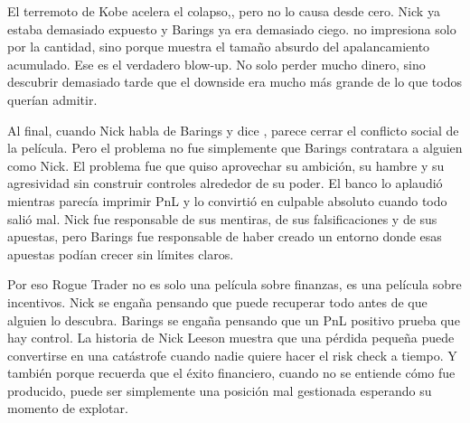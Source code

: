 El terremoto de Kobe acelera el colapso,, pero no lo causa desde cero. Nick ya estaba demasiado expuesto y Barings ya era demasiado ciego.   no impresiona solo por la cantidad, sino porque muestra el tamaño absurdo del apalancamiento acumulado. Ese es el verdadero blow-up. No solo perder mucho dinero, sino descubrir demasiado tarde que el downside era mucho más grande de lo que todos querían admitir.

Al final, cuando Nick habla de Barings y dice , parece cerrar el conflicto social de la película. Pero el problema no fue simplemente que Barings contratara a alguien como Nick. El problema fue que quiso aprovechar su ambición, su hambre y su agresividad sin construir controles alrededor de su poder. El banco lo aplaudió mientras parecía imprimir PnL y lo convirtió en culpable absoluto cuando todo salió mal. Nick fue responsable de sus mentiras, de sus falsificaciones y de sus apuestas, pero Barings fue responsable de haber creado un entorno donde esas apuestas podían crecer sin límites claros.

Por eso Rogue Trader no es solo una película sobre finanzas, es una película sobre incentivos. Nick se engaña pensando que puede recuperar todo antes de que alguien lo descubra. Barings se engaña pensando que un PnL positivo prueba que hay control.  La historia de Nick Leeson muestra que una pérdida pequeña puede convertirse en una catástrofe cuando nadie quiere hacer el risk check a tiempo. Y también porque recuerda que el éxito financiero, cuando no se entiende cómo fue producido, puede ser simplemente una posición mal gestionada esperando su momento de explotar.